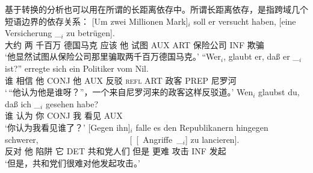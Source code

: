 基于转换的分析也可以用在所谓的长距离依存中。所谓长距离依存，是指跨域几个短语边界的依存关系：
\eal
\label{bsp-Fernabhaengigkeit}
\ex\label{bsp-um-zwei-millionen}
\gll {}[Um zwei Millionen Mark]$_i$ soll er versucht haben, [eine Versicherung \_$_i$ zu betrügen].\footnotemark\\
     {}\spacebr{}大约 两 千百万 德国马克 应该 他 试图 AUX \spacebr{}ART 保险公司 {} INF 欺骗\\
\glt `他显然试图从保险公司那里骗取两千百万德国马克。'
\ex
\gll "`Wer$_i$, glaubt er, daß er \_$_i$ ist?"' erregte sich ein Politiker vom Nil.\footnotemark\\
     \spacebr{}谁 相信 他 CONJ 他 {} AUX 反驳 \textsc{refl} ART 政客 PREP 尼罗河\\
\glt `\,``他认为他是谁呀？''，一个来自尼罗河来的政客这样反驳道。'
\ex\label{ex-wen-glaubst-du-dass}
\gll Wen$_i$ glaubst du, daß ich \_$_i$ gesehen habe?\footnotemark\\
     谁 认为 你 CONJ 我 {} 看见 AUX\\
\glt `你认为我看见谁了？'
\ex 
\gll {}[Gegen ihn]$_i$ falle es den Republikanern hingegen schwerer,~~~~~~~~~~~~~~~~~~~~~ [~[~Angriffe~\_$_i$] zu lancieren].\footnotemark\\
	 {}\spacebr{}反对 他 陷阱 它 DET 共和党人们 但是 更难 \hspaceThis{[~[~}攻击 INF 发起\\
\glt `但是，共和党们很难对他发起攻击。'
\zl
